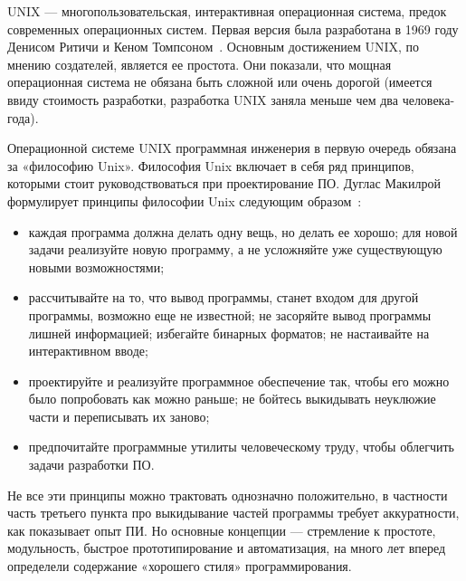 UNIX — многопользовательская, интерактивная операционная система, предок современных операционных систем. Первая версия была разработана в 1969 году Денисом Ритичи и Кеном Томпсоном~\cite{Ritchie:1974:UTS}. Основным достижением UNIX, по мнению создателей, является ее простота. Они показали, что мощная операционная система не обязана быть сложной или очень дорогой (имеется ввиду стоимость разработки, разработка UNIX заняла меньше чем два человека-года).

Операционной системе UNIX программная инженерия в первую очередь обязана за «философию Unix». Философия Unix включает в себя ряд принципов, которыми стоит руководствоваться при проектирование ПО. Дуглас Макилрой формулирует принципы философии Unix следующим образом~\cite{McIlroy:1978:UTS}:
\begin{itemize}
  \item каждая программа должна делать одну вещь, но делать ее хорошо; для новой задачи реализуйте новую программу, а не усложняйте уже существующую новыми возможностями;
  \item рассчитывайте на то, что вывод программы, станет входом для другой программы, возможно еще не известной; не засоряйте вывод программы лишней информацией; избегайте бинарных форматов; не настаивайте на интерактивном вводе;
  \item проектируйте и реализуйте программное обеспечение так, чтобы его можно было попробовать как можно раньше; не бойтесь выкидывать неуклюжие части и переписывать их заново;
  \item предпочитайте программные утилиты человеческому труду, чтобы облегчить задачи разработки ПО.
\end{itemize}

Не все эти принципы можно трактовать однозначно положительно, в частности часть третьего пункта про выкидывание частей программы требует аккуратности, как показывает опыт ПИ. Но основные концепции — стремление к простоте, модульность, быстрое прототипирование и автоматизация, на много лет вперед определели содержание «хорошего стиля» программирования.
